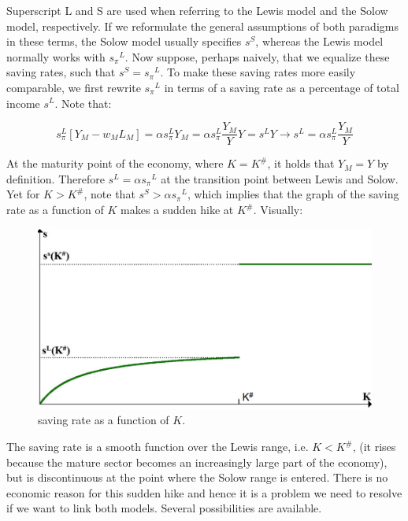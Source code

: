 \documentclass[a4paper]{article}
\begin{document}
Superscript L and S are used when referring to the Lewis model and the Solow model, respectively. If we reformulate the general assumptions of both paradigms in these terms, the Solow model usually specifies $s^S$, whereas the Lewis model normally works with ${s_\pi}^L$. Now suppose, perhaps naively, that we equalize these saving rates, such that $s^S={s_\pi}^L$. To make these saving rates more easily comparable, we first rewrite ${s_\pi}^L$ in terms of a saving rate as a percentage of total income $s^L$. Note that:

\begin{equation}
s_\pi^L [Y_M-w_M L_M ]= \alpha s_\pi^L Y_M= \alpha s_\pi^L  \frac{Y_M}{Y} Y=s^L Y	\rightarrow s^L=\alpha s_\pi^L  \frac{Y_M}{Y}
\end{equation}

At the maturity point of the economy, where $K=K^{\#}$, it holds that $Y_M=Y$ by definition. Therefore $s^L={\alpha s_\pi}^L$ at the transition point between Lewis and Solow. Yet for $K>K^{\#}$, note that $s^S>{\alpha s_\pi}^L$, which implies that the graph of the saving rate as a function of $K$ makes a sudden hike at $K^{\#}$. Visually:

\begin{figure}
\includegraphics[width=\linewidth]{graph1.png}
\caption{\label{fig:Graph 1}saving rate as a function of $K$.}
\end{figure}

The saving rate is a smooth function over the Lewis range, i.e. $K<K^{\#}$, (it rises because the mature sector becomes an increasingly large part of the economy), but is discontinuous at the point where the Solow range is entered. There is no economic reason for this sudden hike and hence it is a problem we need to resolve if we want to link both models. Several possibilities are available.
\end{document}
